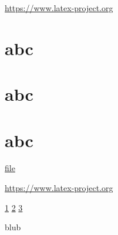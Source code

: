 \documentclass{article}
\begin{document}
\url{https://www.latex-project.org}

\section{abc}\label{sec}

\section{abc}\label{sec2}

\section{abc}\label{sec3}

\href{example-image.pdf}{file}

\newpage

\url{https://www.latex-project.org}


\ref{sec} \quad  \ref{sec2} \quad \ref{sec3}
\newpage

\newpage 

blub
\end{document}
